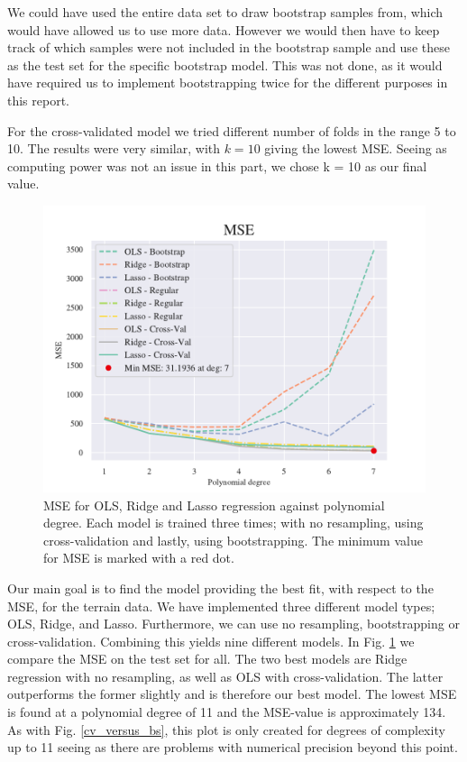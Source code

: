 We could have used the entire data set to draw bootstrap samples from, which would have allowed us to use more data.
However we would then have to keep track of which samples were not included in the bootstrap sample and use these as the test set for the specific bootstrap model. 
This was not done, as it would have required us to implement bootstrapping twice for the different purposes in this report.

For the cross-validated model we tried different number of folds in the range 5 to 10. 
The results were very similar, with $k = 10$ giving the lowest MSE. 
Seeing as computing power was not an issue in this part, we chose k = 10 as our final value. 

\begin{figure}[h!]
    \centering
    \includegraphics[width=1\linewidth]{project_1/figures/figures_in_report/All_terrain.pdf}
    \caption{MSE for OLS, Ridge and Lasso regression against polynomial degree. Each model is trained three times; with no resampling, using cross-validation and lastly, using bootstrapping. The minimum value for MSE is marked with a red dot.}
    \label{all_terrain}
\end{figure}

Our main goal is to find the model providing the best fit, with respect to the MSE, for the terrain data.
We have implemented three different model types; OLS, Ridge, and Lasso. 
Furthermore, we can use no resampling, bootstrapping or cross-validation. 
Combining this yields nine different models. In Fig. \ref{all_terrain} we compare the MSE on the test set for all. 
The two best models are Ridge regression with no resampling, as well as OLS with cross-validation. 
The latter outperforms the former slightly and is therefore our best model. 
The lowest MSE is found at a polynomial degree of 11 and the MSE-value is approximately 134. 
As with Fig. \ref{cv_versus_bs}, this plot is only created for degrees of complexity up to 11 seeing as there are problems with numerical precision beyond this point. 

